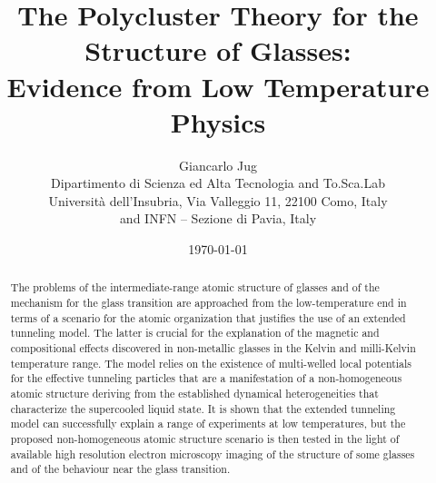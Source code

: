 \documentclass[10pt]{article}
\title{\textbf{The Polycluster Theory for the Structure of Glasses: \\ 
Evidence from Low Temperature Physics}} %
\author{ Giancarlo Jug\cite{J} \\
Dipartimento di Scienza ed Alta Tecnologia and To.Sca.Lab \\
Universit\`a dell'Insubria,
Via Valleggio 11, 22100 Como, Italy \\
and INFN -- Sezione di Pavia, Italy }
\date{\today} %
\begin{document}
\maketitle 

\begin{abstract}
The problems of the intermediate-range atomic structure of glasses and of the 
mechanism for the glass transition are approached from the low-temperature end 
in terms of a scenario for the atomic organization that justifies the use of an 
extended tunneling model. The latter is crucial for the explanation of the magnetic 
and compositional effects discovered in non-metallic glasses in the Kelvin and 
milli-Kelvin temperature range. The model relies on the existence of multi-welled
local potentials for the effective tunneling particles that are a manifestation of 
a non-homogeneous atomic structure deriving from the established dynamical 
heterogeneities that characterize the supercooled liquid state. It is shown that the
extended tunneling model can successfully explain a range of experiments at low
temperatures, but the proposed non-homogeneous atomic structure scenario is 
then tested in the light of available high resolution electron microscopy imaging
of the structure of some glasses and of the behaviour near the glass transition.
\end{abstract}

\newpage

\end{document}
